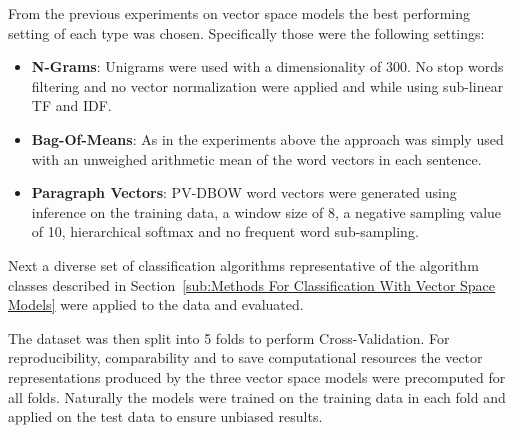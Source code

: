 From the previous experiments on vector space models the best performing setting of each type was chosen.
Specifically those were the following settings:

\begin{itemize}
  \item \textbf{N-Grams}: Unigrams were used with a dimensionality of 300. No stop words filtering and no vector normalization were applied and while using sub-linear TF and IDF.
  \item \textbf{Bag-Of-Means}: As in the experiments above the approach was simply used with an unweighed arithmetic mean of the word vectors in each sentence.
  \item \textbf{Paragraph Vectors}: PV-DBOW word vectors were generated using inference on the training data, a window size of 8, a negative sampling value of 10, hierarchical softmax and no frequent word sub-sampling.
\end{itemize}

Next a diverse set of classification algorithms representative of the algorithm classes described in Section~\ref{sub:Methods For Classification With Vector Space Models} were applied to the data and evaluated.

%

The dataset was then split into 5 folds to perform \gls{Cross-Validation}. For reproducibility, comparability and to save computational resources the vector representations produced by the three vector space models were precomputed for all folds. Naturally the models were trained on the training data in each fold and applied on the test data to ensure unbiased results.

